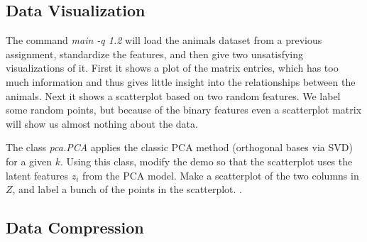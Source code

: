 \documentclass{article}
\begin{document}







\subsection{Data Visualization}

The command \emph{main -q 1.2} will load the animals dataset from a previous assignment, standardize the features, and then give two unsatisfying visualizations of it. 
First it shows a plot of the matrix entries, which has too much information and thus gives little insight into the relationships between the animals. 
Next it shows a scatterplot based on two random features. 
We label some random points, but because of the binary features even a scatterplot matrix will show us almost nothing about the data.

The class \emph{pca.PCA} applies the classic PCA method (orthogonal bases via SVD) for a given $k$. 
Using this class, modify the demo so that the scatterplot uses the latent features $z_i$ from the PCA model. 
Make a scatterplot of the two columns in $Z$, and label a bunch of the points in the scatterplot. .
 

\subsection{Data Compression}
\end{document}
